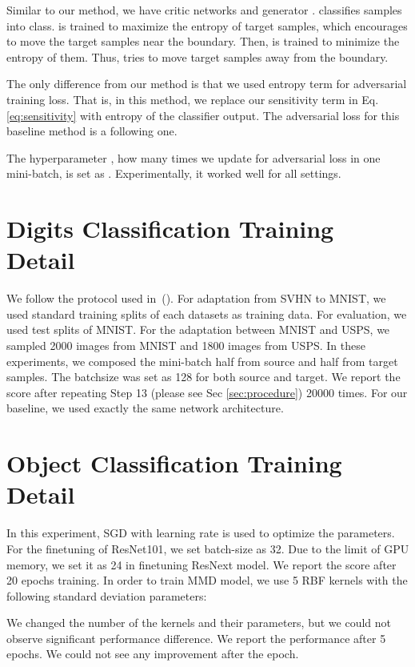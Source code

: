 \documentclass{article} \usepackage{iclr2018_conference,times}
\begin{document}
Similar to our method, we have critic networks  and generator .  classifies samples into  class.
 is trained to maximize the entropy of target samples, which encourages to move the target samples near the boundary. Then,  is trained to minimize the entropy of them. Thus,  tries to move target samples away from the boundary.

The only difference from our method is that we used entropy term for adversarial training loss. That is, in this method, we replace our sensitivity term  in Eq. \ref{eq:sensitivity} with entropy of the classifier output. The adversarial loss for this baseline method is a following one.


The hyperparameter , how many times we update  for adversarial loss in one mini-batch, is set as . Experimentally, it worked well for all settings.  

\vspace{-3mm}
\section{Digits Classification Training Detail}
\vspace{-3mm}
We follow the protocol used in~(\cite{tzeng2017adversarial}). For adaptation from SVHN to MNIST, we used standard training splits of each datasets as training data. For evaluation, we used test splits of MNIST. For the adaptation between MNIST and USPS, we sampled 2000 images from MNIST and 1800 images from USPS.
In these experiments, we composed the mini-batch half from source and half from target samples. The batchsize was set as 128 for both source and target. We report the score after repeating Step 13 (please see Sec \ref{sec:procedure}) 20000 times. For our baseline, we used exactly the same network architecture.
\vspace{-3mm}
\section{Object Classification Training Detail}
\vspace{-3mm}
In this experiment, SGD with learning rate  is used to optimize the parameters. 
For the finetuning of ResNet101, we set batch-size as 32. Due to the limit of GPU memory, we set it as 24 in finetuning ResNext model. We report the score after 20 epochs training.
In order to train MMD model, we use 5 RBF kernels with the following standard deviation parameters:

We changed the number of the kernels and their parameters, but we could not observe significant performance difference. We report the performance after 5 epochs. We could not see any improvement after the epoch.
\end{document}
